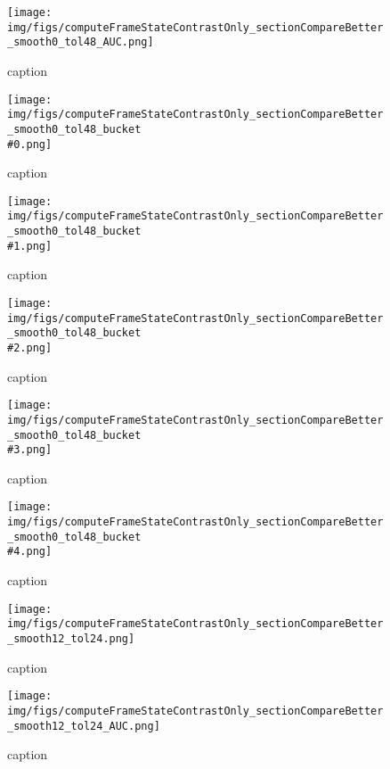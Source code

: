 %
\begin{figure}[!ht]
	\centering
	\texttt{[image: img/figs/computeFrameStateContrastOnly\_sectionCompareBetter\_smooth0\_tol48\_AUC.png]}
	\caption{caption}
	\label{fig:computeFrameStateContrastOnly_sectionCompareBetter_smooth0_tol48_AUC.png}
\end{figure}
%
\begin{figure}[!ht]
	\centering
	\texttt{[image: img/figs/computeFrameStateContrastOnly\_sectionCompareBetter\_smooth0\_tol48\_bucket\\\#0.png]}
	\caption{caption}
	\label{fig:computeFrameStateContrastOnly_sectionCompareBetter_smooth0_tol48_bucket\#0.png}
\end{figure}
%
\begin{figure}[!ht]
	\centering
	\texttt{[image: img/figs/computeFrameStateContrastOnly\_sectionCompareBetter\_smooth0\_tol48\_bucket\\\#1.png]}
	\caption{caption}
	\label{fig:computeFrameStateContrastOnly_sectionCompareBetter_smooth0_tol48_bucket\#1.png}
\end{figure}
%
\begin{figure}[!ht]
	\centering
	\texttt{[image: img/figs/computeFrameStateContrastOnly\_sectionCompareBetter\_smooth0\_tol48\_bucket\\\#2.png]}
	\caption{caption}
	\label{fig:computeFrameStateContrastOnly_sectionCompareBetter_smooth0_tol48_bucket\#2.png}
\end{figure}
%
\begin{figure}[!ht]
	\centering
	\texttt{[image: img/figs/computeFrameStateContrastOnly\_sectionCompareBetter\_smooth0\_tol48\_bucket\\\#3.png]}
	\caption{caption}
	\label{fig:computeFrameStateContrastOnly_sectionCompareBetter_smooth0_tol48_bucket\#3.png}
\end{figure}
%
\begin{figure}[!ht]
	\centering
	\texttt{[image: img/figs/computeFrameStateContrastOnly\_sectionCompareBetter\_smooth0\_tol48\_bucket\\\#4.png]}
	\caption{caption}
	\label{fig:computeFrameStateContrastOnly_sectionCompareBetter_smooth0_tol48_bucket\#4.png}
\end{figure}
%
\begin{figure}[!ht]
	\centering
	\texttt{[image: img/figs/computeFrameStateContrastOnly\_sectionCompareBetter\_smooth12\_tol24.png]}
	\caption{caption}
	\label{fig:computeFrameStateContrastOnly_sectionCompareBetter_smooth12_tol24.png}
\end{figure}
%
\begin{figure}[!ht]
	\centering
	\texttt{[image: img/figs/computeFrameStateContrastOnly\_sectionCompareBetter\_smooth12\_tol24\_AUC.png]}
	\caption{caption}
	\label{fig:computeFrameStateContrastOnly_sectionCompareBetter_smooth12_tol24_AUC.png}
\end{figure}
